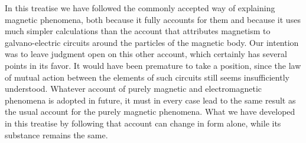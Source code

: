 In this treatise we have followed the commonly accepted way of explaining magnetic phenomena, both because it fully accounts for them and because it uses much simpler calculations than the account that attributes magnetism to galvano-electric circuits around the particles of the magnetic body. Our intention was to leave judgment open on this other account, which certainly has several points in its favor. It would have been premature to take a position, since the law of mutual action between the elements of such circuits still seems insufficiently understood. Whatever account of purely magnetic and electromagnetic phenomena is adopted in future, it must in every case lead to the same result as the usual account for the purely magnetic phenomena. What we have developed in this treatise by following that account can change in form alone, while its substance remains the same.
